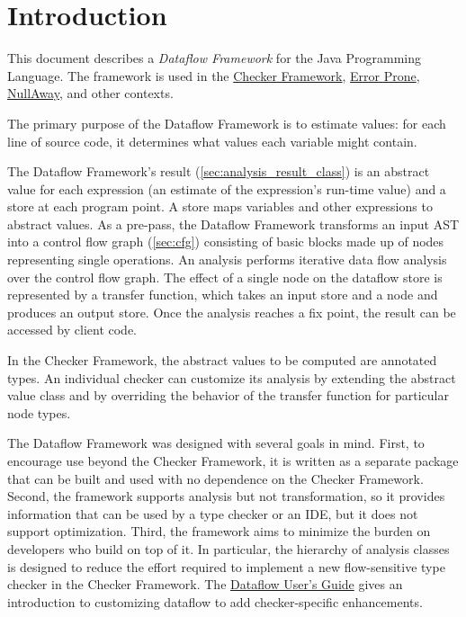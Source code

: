 
\section{Introduction}

This document describes a \emph{Dataflow Framework} for the Java
Programming Language.  The framework is used in the
\href{https://checkerframework.org/}{Checker Framework},
\href{http://errorprone.info/}{Error Prone},
\href{https://github.com/uber/NullAway}{NullAway}, and other contexts.

The primary purpose of the Dataflow Framework is to estimate values:
for each line of source code, it determines what
values each variable might contain.

The Dataflow Framework's result (\autoref{sec:analysis_result_class})
is an abstract value for each expression (an estimate of the
expression's run-time value) and a store at each program point.  A
store maps variables and other expressions to abstract
values.  As a pre-pass, the Dataflow Framework transforms an input
AST into a control flow graph (\autoref{sec:cfg}) consisting of basic
blocks made up of nodes representing single operations.  An analysis
performs iterative data flow
analysis over the control flow graph.  The effect of a single node on
the dataflow store is represented by a transfer function, which takes
an input store and a node and produces an output store.  Once the
analysis reaches a fix point, the result can be accessed by client
code.

In the Checker Framework, the abstract values to be computed are
annotated types.  An individual checker can customize its analysis by
extending the abstract value class and by overriding the behavior of
the transfer function for particular node types.

The Dataflow Framework was
designed with several goals in mind.  First, to encourage use
beyond the Checker Framework, it is written as a separate package that can be
built and used with no dependence on the Checker Framework.  Second,
the framework supports analysis but not
transformation, so it provides information that can be used by a type
checker or an IDE, but it does not support optimization.  Third, the
framework aims to minimize the burden on developers who build on top
of it.  In particular, the hierarchy of analysis classes is designed
to reduce the effort required to implement a new flow-sensitive type
checker in the Checker Framework. The
\href{https://docs.google.com/document/d/1oYzbOrrS4ZEEx4wQgIHbijNzcI5CiQAq_-1NrOS8JME/edit?usp=sharing}{Dataflow User's Guide}
gives an introduction to customizing dataflow to add checker-specific
enhancements.

